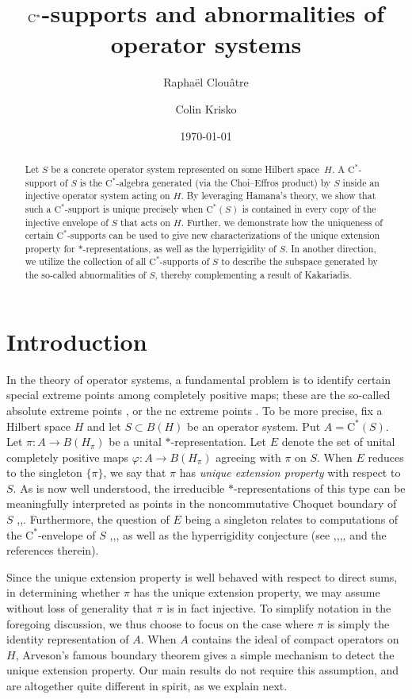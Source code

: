 \documentclass[10pt]{amsart}
\date{\today}
\author{Rapha\"el Clou\^atre}
\author{Colin Krisko}
\title[$\rC^*$-supports and abnormalities]{$\rC^*$-supports and abnormalities of operator systems}
\newcommand{\rC}{\mathrm{C}}
\renewcommand{\phi}{\varphi}
\theoremstyle{definition}
\begin{document}
\begin{abstract}
Let $S$ be a concrete operator system represented on some Hilbert space\ $H$. A $\rC^*$-support of $S$ is the $\rC^*$-algebra generated (via the Choi--Effros product) by $S$ inside an injective operator system  acting on $H$. By leveraging Hamana's theory, we show that such a $\rC^*$-support is unique precisely when $\rC^*(S)$ is contained in every copy of the injective envelope of $S$ that acts on $H$. Further, we demonstrate how the uniqueness of certain $\rC^*$-supports can be used to give new characterizations of the unique extension property for $*$-representations, as well as the hyperrigidity of $S$. In another direction, we utilize the collection of all $\rC^*$-supports of $S$ to describe the subspace generated by the so-called abnormalities of $S$, thereby complementing a result of Kakariadis.
\end{abstract}
\maketitle

\section{Introduction}

In the theory of operator systems, a fundamental problem is to identify certain special extreme points among completely positive maps; these are the so-called absolute extreme points \cite{EHKM2018},\cite{EH2019} or the nc extreme points \cite{DK2019}. 
To be more precise, fix a Hilbert space $H$ and let $S\subset B(H)$ be an operator system. Put $A=\rC^*(S)$. Let  $\pi:A\to B(H_\pi)$ be a unital $*$-representation. Let $E$ denote the set of unital completely positive maps $\phi:A\to B(H_\pi)$ agreeing with $\pi$ on $S$.  When $E$ reduces to the singleton $\{\pi\}$, we say that $\pi$ has \emph{unique extension property} with respect to $S$. As is now well understood, the irreducible $*$-representations of this type  can be meaningfully interpreted as points in the noncommutative Choquet boundary of $S$ \cite{kleski2014bdry},\cite{DK2019},\cite{CTh2023}. Furthermore, the question of $E$ being a singleton relates to computations of the $\rC^*$-envelope of $S$ \cite{dritschel2005},\cite{arveson2008},\cite{DK2015}, as well as the hyperrigidity conjecture (see \cite{DK2021},\cite{CS2023},\cite{BDO2024},\cite{CTh2024}, \cite{bilich2025} and the references therein). 

Since the unique extension property is well behaved with respect to direct sums, in determining whether $\pi$ has the unique extension property, we may assume without loss of generality that $\pi$ is in fact injective. To simplify notation in the foregoing discussion, we thus choose to focus on the case where $\pi$ is simply  the identity representation of $A$. When $A$ contains the ideal of compact operators on $H$, Arveson's famous boundary theorem \cite[Theorem 2.1.1]{arveson1972} gives a simple mechanism to detect the unique extension property. Our main results do not require this assumption, and are altogether quite different in spirit, as we explain next.
\end{document}
